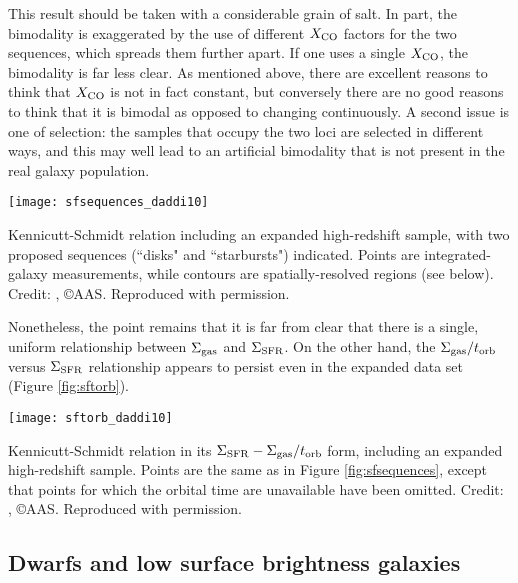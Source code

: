 This result should be taken with a considerable grain of salt. In part, the bimodality is exaggerated by the use of different $X_{\rm CO}$ factors for the two sequences, which spreads them further apart. If one uses a single $X_{\rm CO}$, the bimodality is far less clear. As mentioned above, there are excellent reasons to think that $X_{\rm CO}$ is not in fact constant, but conversely there are no good reasons to think that it is bimodal as opposed to changing continuously. A second issue is one of selection: the samples that occupy the two loci are selected in different ways, and this may well lead to an artificial bimodality that is not present in the real galaxy population.
\begin{marginfigure}
\texttt{[image: sfsequences\_daddi10]}
\caption[Kennicutt-Schmidt relation, with additional high-redshift data]{
\label{fig:sfsequences}
Kennicutt-Schmidt relation including an expanded high-redshift sample, with two proposed sequences (``disks" and ``starbursts") indicated. Points are integrated-galaxy measurements, while contours are spatially-resolved regions (see below). Credit: \citet{daddi10a}, \copyright AAS. Reproduced with permission.
}
\end{marginfigure}

Nonetheless, the point remains that it is far from clear that there is a single, uniform relationship between $\Sigma_{\rm gas}$ and $\Sigma_{\rm SFR}$. On the other hand, the $\Sigma_{\rm gas}/t_{\rm orb}$ versus $\Sigma_{\rm SFR}$ relationship appears to persist even in the expanded data set (Figure \ref{fig:sftorb}).
\begin{marginfigure}
\texttt{[image: sftorb\_daddi10]}
\caption[Kennicutt-Schmidt relation, orbital time version, with additional high-redshift data]{
\label{fig:sftorb}
Kennicutt-Schmidt relation in its $\Sigma_{\rm SFR}-\Sigma_{\rm gas}/t_{\rm orb}$ form, including an expanded high-redshift sample. Points are the same as in Figure \ref{fig:sfsequences}, except that points for which the orbital time are unavailable have been omitted. Credit: \citet{daddi10a}, \copyright AAS. Reproduced with permission.
}
\end{marginfigure}

\subsection{Dwarfs and low surface brightness galaxies}

